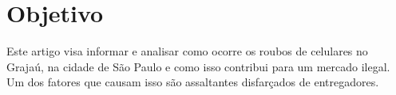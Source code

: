 \section{Objetivo}

    Este artigo visa informar e analisar como ocorre os roubos de celulares
    no Grajaú, na cidade de São Paulo e como isso contribui para um mercado ilegal. 
    Um dos fatores que causam isso são assaltantes disfarçados de entregadores.